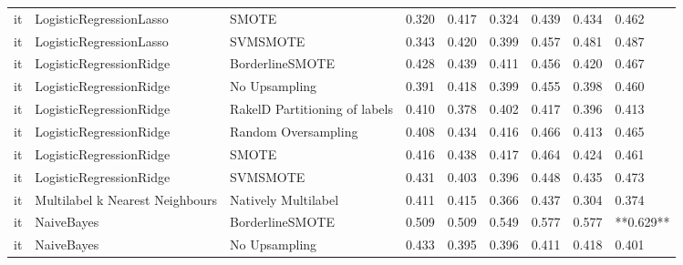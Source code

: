 \begin{tabular}{lllllllll}
      it &         LogisticRegressionLasso &                         SMOTE & 0.320 &                     0.417 &                 0.324 &                  0.439 &                                   0.434 &     0.462 \\
      it &         LogisticRegressionLasso &                      SVMSMOTE & 0.343 &                     0.420 &                 0.399 &                  0.457 &                                   0.481 &     0.487 \\
      it &         LogisticRegressionRidge &               BorderlineSMOTE & 0.428 &                     0.439 &                 0.411 &                  0.456 &                                   0.420 &     0.467 \\
      it &         LogisticRegressionRidge &                 No Upsampling & 0.391 &                     0.418 &                 0.399 &                  0.455 &                                   0.398 &     0.460 \\
      it &         LogisticRegressionRidge & RakelD Partitioning of labels & 0.410 &                     0.378 &                 0.402 &                  0.417 &                                   0.396 &     0.413 \\
      it &         LogisticRegressionRidge &           Random Oversampling & 0.408 &                     0.434 &                 0.416 &                  0.466 &                                   0.413 &     0.465 \\
      it &         LogisticRegressionRidge &                         SMOTE & 0.416 &                     0.438 &                 0.417 &                  0.464 &                                   0.424 &     0.461 \\
      it &         LogisticRegressionRidge &                      SVMSMOTE & 0.431 &                     0.403 &                 0.396 &                  0.448 &                                   0.435 &     0.473 \\
      it & Multilabel k Nearest Neighbours &           Natively Multilabel & 0.411 &                     0.415 &                 0.366 &                  0.437 &                                   0.304 &     0.374 \\
      it &                      NaiveBayes &               BorderlineSMOTE & 0.509 &                     0.509 &                 0.549 &                  0.577 &                                   0.577 & **0.629** \\
      it &                      NaiveBayes &                 No Upsampling & 0.433 &                     0.395 &                 0.396 &                  0.411 &                                   0.418 &     0.401 \\

\end{tabular}
